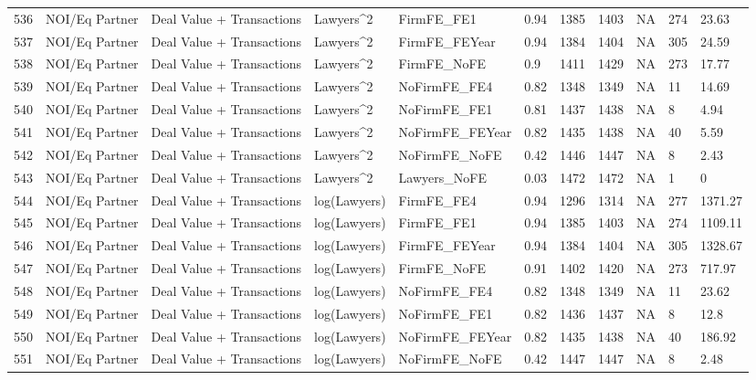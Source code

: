 \begin{table}[ht]
\begin{tabular}{rllllllllll}
  536 & NOI/Eq Partner & Deal Value + Transactions & Lawyers^2 & FirmFE\_FE1 & 0.94 & 1385 & 1403 & NA & 274 & 23.63 \\ 
  537 & NOI/Eq Partner & Deal Value + Transactions & Lawyers^2 & FirmFE\_FEYear & 0.94 & 1384 & 1404 & NA & 305 & 24.59 \\ 
  538 & NOI/Eq Partner & Deal Value + Transactions & Lawyers^2 & FirmFE\_NoFE & 0.9 & 1411 & 1429 & NA & 273 & 17.77 \\ 
  539 & NOI/Eq Partner & Deal Value + Transactions & Lawyers^2 & NoFirmFE\_FE4 & 0.82 & 1348 & 1349 & NA & 11 & 14.69 \\ 
  540 & NOI/Eq Partner & Deal Value + Transactions & Lawyers^2 & NoFirmFE\_FE1 & 0.81 & 1437 & 1438 & NA & 8 & 4.94 \\ 
  541 & NOI/Eq Partner & Deal Value + Transactions & Lawyers^2 & NoFirmFE\_FEYear & 0.82 & 1435 & 1438 & NA & 40 & 5.59 \\ 
  542 & NOI/Eq Partner & Deal Value + Transactions & Lawyers^2 & NoFirmFE\_NoFE & 0.42 & 1446 & 1447 & NA & 8 & 2.43 \\ 
  543 & NOI/Eq Partner & Deal Value + Transactions & Lawyers^2 & Lawyers\_NoFE & 0.03 & 1472 & 1472 & NA & 1 & 0 \\ 
  544 & NOI/Eq Partner & Deal Value + Transactions & log(Lawyers) & FirmFE\_FE4 & 0.94 & 1296 & 1314 & NA & 277 & 1371.27 \\ 
  545 & NOI/Eq Partner & Deal Value + Transactions & log(Lawyers) & FirmFE\_FE1 & 0.94 & 1385 & 1403 & NA & 274 & 1109.11 \\ 
  546 & NOI/Eq Partner & Deal Value + Transactions & log(Lawyers) & FirmFE\_FEYear & 0.94 & 1384 & 1404 & NA & 305 & 1328.67 \\ 
  547 & NOI/Eq Partner & Deal Value + Transactions & log(Lawyers) & FirmFE\_NoFE & 0.91 & 1402 & 1420 & NA & 273 & 717.97 \\ 
  548 & NOI/Eq Partner & Deal Value + Transactions & log(Lawyers) & NoFirmFE\_FE4 & 0.82 & 1348 & 1349 & NA & 11 & 23.62 \\ 
  549 & NOI/Eq Partner & Deal Value + Transactions & log(Lawyers) & NoFirmFE\_FE1 & 0.82 & 1436 & 1437 & NA & 8 & 12.8 \\ 
  550 & NOI/Eq Partner & Deal Value + Transactions & log(Lawyers) & NoFirmFE\_FEYear & 0.82 & 1435 & 1438 & NA & 40 & 186.92 \\ 
  551 & NOI/Eq Partner & Deal Value + Transactions & log(Lawyers) & NoFirmFE\_NoFE & 0.42 & 1447 & 1447 & NA & 8 & 2.48 \\ 

\end{tabular}
\end{table}
